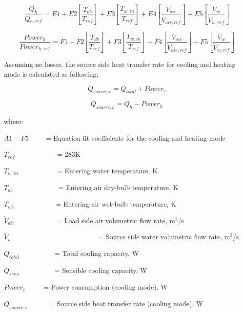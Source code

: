 \begin{equation}
\frac{{{Q_h}}}{{Q{}_{h,ref}}} = E1 + E2\left[ {\frac{{{T_{db}}}}{{{T_{ref}}}}} \right] + E3\left[ {\frac{{T{}_{w,in}}}{{T{}_{ref}}}} \right] + E4\left[ {\frac{{{{\dot V}_{air}}}}{{{{\dot V}_{air,ref}}}}} \right] + E5\left[ {\frac{{{{\dot V}_w}}}{{{{\dot V}_{w,ref}}}}} \right]
\end{equation}

\begin{equation}
\frac{{Powe{r_h}}}{{Power{}_{h,ref}}} = F1 + F2\left[ {\frac{{{T_{db}}}}{{{T_{ref}}}}} \right] + F3\left[ {\frac{{T{}_{w,in}}}{{T{}_{ref}}}} \right] + F4\left[ {\frac{{{{\dot V}_{air}}}}{{{{\dot V}_{air,ref}}}}} \right] + F5\left[ {\frac{{{{\dot V}_w}}}{{{{\dot V}_{w,ref}}}}} \right]
\end{equation}

Assuming no losses, the source side heat transfer rate for cooling and heating mode is calculated as following;

\begin{equation}
{Q_{source,c}} = {Q_{total}} + Powe{r_c}
\end{equation}

\begin{equation}
{Q_{source,h}} = {Q_h} - Powe{r_h}
\end{equation}

where:

\(A1 - F5\) ~ ~~ = Equation fit coefficients for the cooling and heating mode

\({T_{ref}}\) ~~~~~~~~~~~ = 283K

\({T_{w,in}}\) ~~~~~~~~~~ = Entering water temperature, K

\({T_{db}}\) ~~~~~~~~~~~~ = Entering air dry-bulb temperature, K

\({T_{wb}}\) ~~~~~~~~~~~ = Entering air wet-bulb temperature, K

\({\dot V_{air}}\) ~~~~~~~~~~~ = Load side air volumetric flow rate, m\(^{3}\)/s

\({\dot V_w}\) ~~~~~~~~~~~~~~~~~~~~~~~~ = Source side water volumetric flow rate, m\(^{3}\)/s

\({Q_{total}}\) ~~~~~~~~~ = Total cooling capacity, W

\({Q_{sens}}\) ~~~~~~~~~ = Sensible cooling capacity, W

\(Powe{r_c}\) ~~~~ = Power consumption (cooling mode), W

\({Q_{source,c}}\) ~~~~~ = Source side heat transfer rate (cooling mode), W

